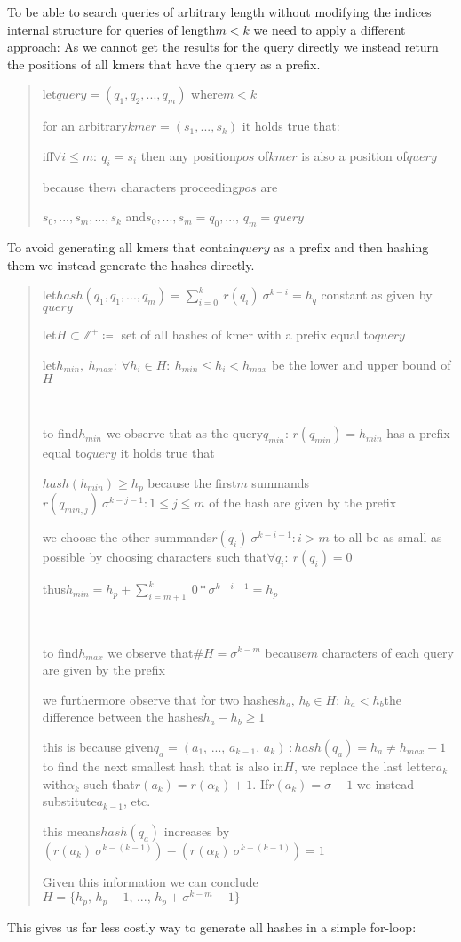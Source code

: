 To be able to search queries of arbitrary length without modifying
the indices internal structure for queries of length$m<k$ we need
to apply a different approach: As we cannot get the results for the
query directly we instead return the positions of all kmers that have
the query as a prefix.
\begin{verse}
let$query=(q_{1},q_{2},...,q_{m})$ where$m<k$

for an arbitrary$kmer=(s_{1},...,s_{k})$ it holds true that:

iff$\forall i\leq m:\:q_{i}=s_{i}$ then any position$pos$ of$kmer$
is also a position of$query$

because the$m$ characters proceeding$pos$ are

$s_{0},...,s_{m},...,s_{k}$ and$s_{0},...,s_{m}=q_{0},...,\,q_{m}=query$
\end{verse}
\noindent To avoid generating all kmers that contain$query$ as a
prefix and then hashing them we instead generate the hashes directly.
\begin{verse}
let$hash(q_{1},q_{1},...,q_{m})=\sum_{i=0}^{k}\:r(q_{i})\:\sigma^{k-i}=h_{q}$
constant as given by$query$

let$H\subset\mathbb{Z}^{+}\coloneqq$ set of all hashes of kmer with
a prefix equal to$query$

let$h_{min},\:h_{max}:\:\forall h_{i}\in H:\:h_{min}\leq h_{i}<h_{max}$
be the lower and upper bound of$H$

~

to find$h_{min}$ we observe that as the query$q_{min}:\,r(q_{min})=h_{min}$
has a prefix equal to$query$ it holds true that

$hash(h_{min})\geq h_{p}$ because the first$m$ summands$r(q_{min,j})\:\sigma^{k-j-1}:1\leq j\leq m$
of the hash are given by the prefix

we choose the other summands$r(q_{i})\:\sigma^{k-i-1}:i>m$ to all
be as small as possible by choosing characters such that$\forall q_{i}:\:r(q_{i})=0$

thus$h_{min}=h_{p}+\sum_{i=m+1}^{k}\:0*\sigma^{k-i-1}=h_{p}$

~

to find$h_{max}$ we observe that$\#H=\sigma^{k-m}$ because$m$ characters
of each query are given by the prefix

we furthermore observe that for two hashes$h_{a},\,h_{b}\in H:\,h_{a}<h_{b}$the
difference between the hashes$h_{a}-h_{b}\geq1$

this is because given$q_{a}=(a_{1},\,...,\,a_{k-1},\,a_{k})\::hash(q_{a})=h_{a}\neq h_{max}-1$
to find the next smallest hash that is also in$H$, we replace the
last letter$a_{k}$ with$\alpha_{k}$ such that$r(a_{k})=r(\alpha_{k})+1$.
If$r(a_{k})=\sigma-1$ we instead substitute$a_{k-1}$, etc.

this means$hash(q_{a})$ increases by$(r(a_{k})\:\sigma^{k-(k-1)})-(r(\alpha_{k})\:\sigma^{k-(k-1)})=1$

Given this information we can conclude$H=\{h_{p},\,h_{p}+1,\,...,\,h_{p}+\sigma^{k-m}-1\}$
\end{verse}
This gives us far less costly way to generate all hashes in a simple
for-loop:

